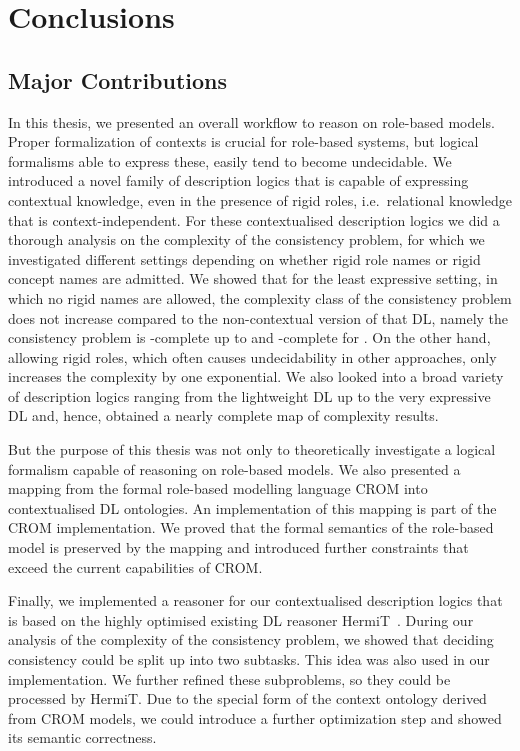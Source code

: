 \chapter{Conclusions}
\label{cha:conclusions}


\section{Major Contributions}
\label{sec:major-contributions}

In this thesis, we presented an overall workflow to reason on role-based models. Proper
formalization of contexts is crucial for role-based systems, but logical formalisms able to express
these, easily tend to become undecidable.  We introduced a novel family of description logics that
is capable of expressing contextual knowledge, even in the presence of rigid roles, i.e.\ relational
knowledge that is context-independent.  For these contextualised description logics we did a
thorough analysis on the complexity of the consistency problem, for which we investigated different
settings depending on whether rigid role names or rigid concept names are admitted. We showed that
for the least expressive setting, in which no rigid names are allowed, the complexity class of the
consistency problem does not increase compared to the non-contextual version of that DL, namely the
consistency problem is \ExpTime-complete up to \SHOQSHOQ and \NExpTime-complete for \SHOIQSHOIQ. On
the other hand, allowing rigid roles, which often causes undecidability in other approaches, only
increases the complexity by one exponential.
%
We also looked into a broad variety of description logics
ranging from the lightweight DL \EL up to the very expressive DL \SHOIQ and, hence, obtained a
nearly complete map of complexity results.

But the purpose of this thesis was not only to theoretically investigate a logical formalism capable
of reasoning on role-based models. We also presented a mapping from the formal role-based modelling
language CROM into contextualised DL ontologies. An implementation of this mapping is part of the CROM
implementation. We proved that the formal semantics of the role-based model is preserved
by the mapping and introduced further constraints that exceed the current capabilities of CROM.

Finally, we implemented a reasoner for our contextualised description logics that is based on the highly
optimised existing DL reasoner HermiT~\cite{GHM-JAR14}.  During our analysis of the complexity of
the consistency problem, we showed that deciding consistency could be split up into two
subtasks. This idea was also used in our implementation.  We further refined these subproblems, so
they could be processed by HermiT.  Due to the special form of the context ontology derived from
CROM models, we could introduce a further optimization step and showed its semantic correctness.




